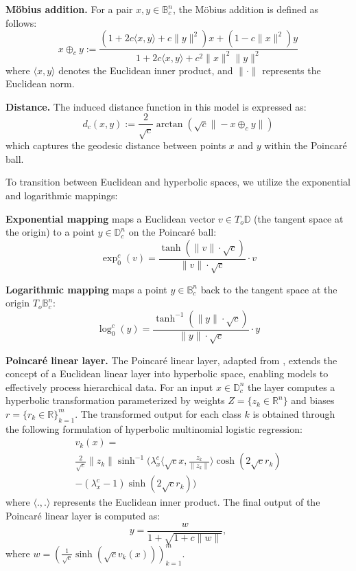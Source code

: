\documentclass[11pt]{article}
\begin{document}
\noindent
\textbf{Möbius addition.} For a pair $x,y \in \mathbb{B}_c^n$, the Möbius addition is defined as follows:
\[
x \oplus_c y := \frac{(1+2c\langle x, y \rangle + c\| y \|^2)x + (1-c\| x \|^2)y}{1 + 2c\langle x, y \rangle + c^2\| x \|^2\| y \|^2}
\]
where $\langle x, y \rangle$ denotes the Euclidean inner product, and $\| \cdot \|$ represents the Euclidean norm.

\noindent
\textbf{Distance.} The induced distance function in this model is expressed as:
\[
d_c(x,y) := \frac{2}{\sqrt{c}} \arctan(\sqrt{c}\|-x \oplus_c y\|)
\]
which captures the geodesic distance between points $x$ and $y$ within the Poincaré ball.

To transition between Euclidean and hyperbolic spaces, we utilize the exponential and logarithmic mappings:

\noindent
\textbf{Exponential mapping} maps a Euclidean vector \( v \in T_o\mathbb{D} \) (the tangent space at the origin) to a point \( y \in \mathbb{D}_c^n \) on the Poincaré ball:  
    \[
    \exp_0^c(v) = \frac{\tanh\left(\|v\| \cdot \sqrt{c}\right)}{\|v\| \cdot \sqrt{c}} \cdot v
    \]

\noindent
\textbf{Logarithmic mapping} maps a point \( y \in \mathbb{B}_c^n \) back to the tangent space at the origin \( T_o\mathbb{B}_c^n \):  
    \[
    \log_0^c(y) = \frac{\tanh^{-1}(\|y\| \cdot \sqrt{c})}{\|y\| \cdot \sqrt{c}} \cdot y
    \]

\noindent
\textbf{Poincaré linear layer.}
The Poincaré linear layer, adapted from \citet{shimizu2021hyperbolicneuralnetworks, vanspengler2023poincareresnet}, extends the concept of a Euclidean linear layer into hyperbolic space, enabling models to effectively process hierarchical data. For an input $x \in \mathbb{D}_c^n$ the layer computes a hyperbolic transformation parameterized by weights $Z = \{z_k \in \mathbb{R}^n\}$ and biases $r = \{r_k \in \mathbb{R}\}_{k=1}^m$. The transformed output for each class $k$ is obtained through the following formulation of hyperbolic multinomial logistic regression:
\begin{multline}
v_k(x) = \\ \frac{2}{\sqrt{c}} \|z_k\| \sinh^{-1}\bigg(
\lambda^c_x \big\langle \sqrt{c}x, \frac{z_k}{\|z_k\|} \big\rangle \cosh(2\sqrt{c}r_k) \\
- (\lambda_x^c - 1) \sinh(2\sqrt{c}r_k)
\bigg)
\end{multline}
where $\big\langle .,. \big\rangle$ represents the Euclidean inner product. The final output of the Poincaré linear layer is  computed as:
\[
y = \frac{w}{1 + \sqrt{1 + c\|w\|}},
\]
where $w = (\frac{1}{\sqrt{c}}\sinh(\sqrt{c}v_k(x)))_{k=1}^m$.
\vspace{5mm}
\end{document}
